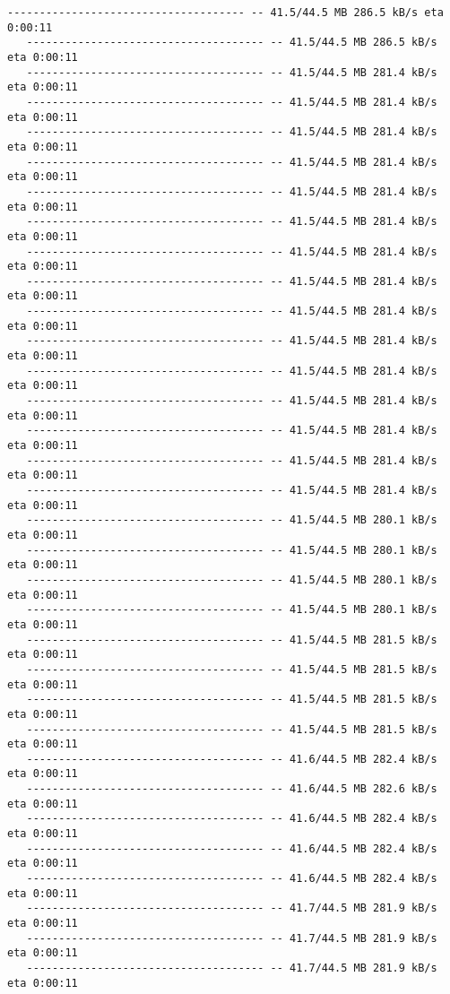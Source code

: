 \documentclass[11pt]{article}
\begin{document}
\begin{Verbatim}[commandchars=\\\{\}]
   ------------------------------------- -- 41.5/44.5 MB 286.5 kB/s eta 0:00:11
   ------------------------------------- -- 41.5/44.5 MB 286.5 kB/s eta 0:00:11
   ------------------------------------- -- 41.5/44.5 MB 281.4 kB/s eta 0:00:11
   ------------------------------------- -- 41.5/44.5 MB 281.4 kB/s eta 0:00:11
   ------------------------------------- -- 41.5/44.5 MB 281.4 kB/s eta 0:00:11
   ------------------------------------- -- 41.5/44.5 MB 281.4 kB/s eta 0:00:11
   ------------------------------------- -- 41.5/44.5 MB 281.4 kB/s eta 0:00:11
   ------------------------------------- -- 41.5/44.5 MB 281.4 kB/s eta 0:00:11
   ------------------------------------- -- 41.5/44.5 MB 281.4 kB/s eta 0:00:11
   ------------------------------------- -- 41.5/44.5 MB 281.4 kB/s eta 0:00:11
   ------------------------------------- -- 41.5/44.5 MB 281.4 kB/s eta 0:00:11
   ------------------------------------- -- 41.5/44.5 MB 281.4 kB/s eta 0:00:11
   ------------------------------------- -- 41.5/44.5 MB 281.4 kB/s eta 0:00:11
   ------------------------------------- -- 41.5/44.5 MB 281.4 kB/s eta 0:00:11
   ------------------------------------- -- 41.5/44.5 MB 281.4 kB/s eta 0:00:11
   ------------------------------------- -- 41.5/44.5 MB 281.4 kB/s eta 0:00:11
   ------------------------------------- -- 41.5/44.5 MB 281.4 kB/s eta 0:00:11
   ------------------------------------- -- 41.5/44.5 MB 280.1 kB/s eta 0:00:11
   ------------------------------------- -- 41.5/44.5 MB 280.1 kB/s eta 0:00:11
   ------------------------------------- -- 41.5/44.5 MB 280.1 kB/s eta 0:00:11
   ------------------------------------- -- 41.5/44.5 MB 280.1 kB/s eta 0:00:11
   ------------------------------------- -- 41.5/44.5 MB 281.5 kB/s eta 0:00:11
   ------------------------------------- -- 41.5/44.5 MB 281.5 kB/s eta 0:00:11
   ------------------------------------- -- 41.5/44.5 MB 281.5 kB/s eta 0:00:11
   ------------------------------------- -- 41.5/44.5 MB 281.5 kB/s eta 0:00:11
   ------------------------------------- -- 41.6/44.5 MB 282.4 kB/s eta 0:00:11
   ------------------------------------- -- 41.6/44.5 MB 282.6 kB/s eta 0:00:11
   ------------------------------------- -- 41.6/44.5 MB 282.4 kB/s eta 0:00:11
   ------------------------------------- -- 41.6/44.5 MB 282.4 kB/s eta 0:00:11
   ------------------------------------- -- 41.6/44.5 MB 282.4 kB/s eta 0:00:11
   ------------------------------------- -- 41.7/44.5 MB 281.9 kB/s eta 0:00:11
   ------------------------------------- -- 41.7/44.5 MB 281.9 kB/s eta 0:00:11
   ------------------------------------- -- 41.7/44.5 MB 281.9 kB/s eta 0:00:11

\end{Verbatim}
\end{document}
